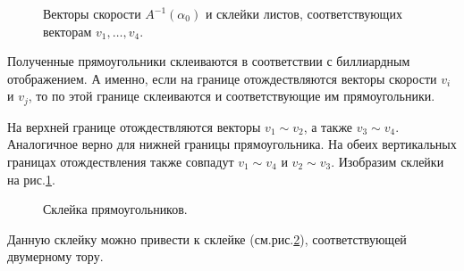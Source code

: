 \begin{example}
    \begin{figure}[ht]
        \centering
        \caption{Векторы скорости $A^{-1}(\alpha_0)$ и склейки листов, соответствующих векторам $v_1, \dots, v_4$.}
        \label{fig:c15.6}
    \end{figure}

    Полученные прямоугольники склеиваются в соответствии с биллиардным отображением. А именно, если на границе отождествляются векторы скорости $v_i$ и $v_j$, то по этой границе склеиваются и соответствующие им прямоугольники.

    На верхней границе отождествляются векторы $v_1 \sim v_2$, а также $v_3 \sim v_4$. Аналогичное верно для нижней границы прямоугольника. На обеих вертикальных границах отождествления также совпадут $v_1 \sim v_4$ и $v_2 \sim v_3$. 
    Изобразим склейки на рис.\ref{fig:c15.6}.

    \begin{figure}[ht]
        \centering
        \caption{Склейка прямоугольников.}
        \label{fig:c15.7}
    \end{figure}

    Данную склейку можно привести к склейке (см.рис.\ref{fig:c15.7}), соответствующей двумерному тору.
\end{example}